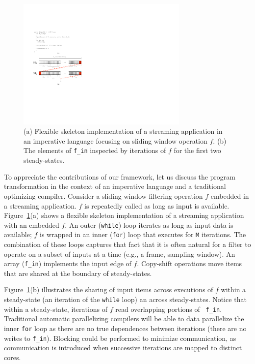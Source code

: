 \begin{figure}[t]
\centering
\includegraphics[width=3.3in]{figures/early-example.pdf}
\caption{(a) Flexible skeleton implementation of a streaming
  application in an imperative language focusing on sliding window
  operation $f$. (b) The elements of {\tt f\_in} inspected by
  iterations of $f$ for the first two steady-states.
\label{fig:comparison}}
\vspace{-10pt}
\end{figure}

To appreciate the contributions of our framework, let us discuss the
program transformation in the context of an imperative language and a
traditional optimizing compiler.  Consider a sliding window filtering
operation $f$ embedded in a streaming application.  $f$ is repeatedly
called as long as input is available.  Figure~\ref{fig:comparison}(a)
shows a flexible skeleton implementation of a streaming application
with an embedded $f$.  An outer ({\tt while}) loop iterates as long as
input data is available; $f$ is wrapped in an inner ({\tt for}) loop
that executes for {\tt M} iterations.  The combination of these loops
captures that fact that it is often natural for a filter to operate on
a subset of inputs at a time (e.g., a frame, sampling window). An
array ({\tt f\_in}) implements the input edge of $f$.  Copy-shift
operations move items that are shared at the boundary of
steady-states. 

Figure~\ref{fig:comparison}(b) illustrates the sharing of input items
across executions of $f$ within a steady-state (an iteration of the
{\tt while} loop) an across steady-states.  Notice that within a
steady-state, iterations of $f$ read overlapping portions of {\tt
  f\_in}.  Traditional automatic parallelizing compilers will be able
to data parallelize the inner {\tt for} loop as there are no true
dependences between iterations (there are no writes to {\tt f\_in}).
Blocking could be performed to minimize communication, as
communication is introduced when successive iterations are mapped to
distinct cores.  

